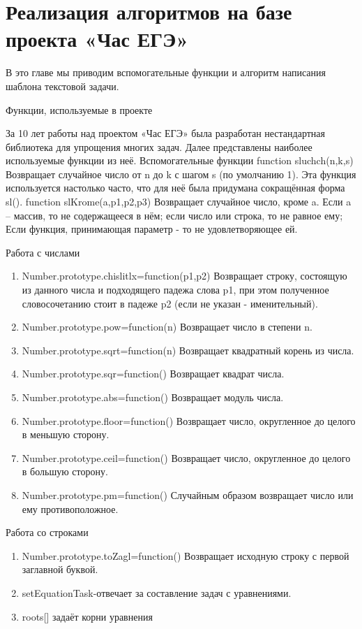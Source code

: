 
\section{Реализация алгоритмов на базе проекта «Час ЕГЭ»}
В это главе мы приводим вспомогательные функции и алгоритм написания шаблона текстовой задачи.

Функции, используемые в проекте

За 10 лет работы над проектом «Час ЕГЭ» была разработан нестандартная библиотека для упрощения многих задач. Далее представлены наиболее используемые функции из неё.
Вспомогательные функции
function sluchch(n,k,s) Возвращает случайное число от n до k с шагом s (по умолчанию 1). Эта функция используется настолько часто, что для неё была придумана сокращённая форма sl(). function slKrome(a,p1,p2,p3) Возвращает случайное число, кроме a. Если a – массив, то не содержащееся в нём; если число или строка, то не равное ему; Если функция, принимающая параметр - то не удовлетворяющее ей.
\par Работа с числами
\begin{enumerate}
    \item Number.prototype.chislitlx=function(p1,p2) Возвращает строку, состоящую из данного числа и подходящего падежа слова p1, при этом полученное словосочетанию стоит в падеже p2 (если не указан - именительный).
    \item Number.prototype.pow=function(n) Возвращает число в степени n. 
    \item Number.prototype.sqrt=function(n) Возвращает квадратный корень из числа. 
    \item Number.prototype.sqr=function() Возвращает квадрат числа. 
    \item Number.prototype.abs=function() Возвращает модуль числа. 
    \item Number.prototype.floor=function() Возвращает число, округленное до целого в меньшую сторону. 
    \item Number.prototype.ceil=function() Возвращает число, округленное до целого в большую сторону. 
    \item Number.prototype.pm=function() Случайным образом возвращает число или ему противоположное. 
\end{enumerate}
\par Работа со строками 
\begin{enumerate}
    \item Number.prototype.toZagl=function() Возвращает исходную строку с первой заглавной буквой.
    \item setEquationTask-отвечает за составление задач с уравнениями.
    \item roots[] задаёт корни уравнения
\end{enumerate}

